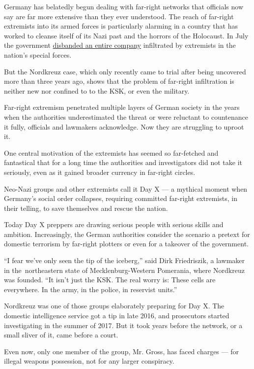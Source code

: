 Germany has belatedly begun dealing with far-right networks that
officials now say are far more extensive than they ever understood. The
reach of far-right extremists into its armed forces is particularly
alarming in a country that has worked to cleanse itself of its Nazi past
and the horrors of the Holocaust. In July the government
\href{https://www.nytimes.com/2020/07/01/world/europe/german-special-forces-far-right.html}{disbanded
an entire company} infiltrated by extremists in the nation's special
forces.

But the Nordkreuz case, which only recently came to trial after being
uncovered more than three years ago, shows that the problem of far-right
infiltration is neither new nor confined to to the KSK, or even the
military.

Far-right extremism penetrated multiple layers of German society in the
years when the authorities underestimated the threat or were reluctant
to countenance it fully, officials and lawmakers acknowledge. Now they
are struggling to uproot it.

One central motivation of the extremists has seemed so far-fetched and
fantastical that for a long time the authorities and investigators did
not take it seriously, even as it gained broader currency in far-right
circles.

Neo-Nazi groups and other extremists call it Day X --- a mythical moment
when Germany's social order collapses, requiring committed far-right
extremists, in their telling, to save themselves and rescue the nation.

Today Day X preppers are drawing serious people with serious skills and
ambition. Increasingly, the German authorities consider the scenario a
pretext for domestic terrorism by far-right plotters or even for a
takeover of the government.

``I fear we've only seen the tip of the iceberg,'' said Dirk
Friedriszik, a lawmaker in the~northeastern state of Mecklenburg-Western
Pomerania, where Nordkreuz was founded. ``It isn't just the KSK. The
real worry is: These cells are everywhere. In the army, in the police,
in reservist units.''

Nordkreuz was one of those groups elaborately preparing for Day X. The
domestic intelligence service got a tip in late 2016, and prosecutors
started investigating in the summer of 2017. But it took years before
the network, or a small sliver of it, came before a court.

Even now, only one member of the group, Mr. Gross, has faced charges ---
for illegal weapons possession, not for any larger conspiracy.

